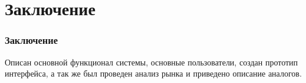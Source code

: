 \documentclass[aspectratio=169]{beamer}
\begin{document}
\section{Заключение}

\begin{frame}
    \frametitle{Заключение}
    Описан основной функционал системы, основные пользователи, создан прототип интерфейса, а так же был проведен анализ рынка и
    приведено описание аналогов.
\end{frame}

\begin{frame}[plain]
\end{frame}
\end{document}
